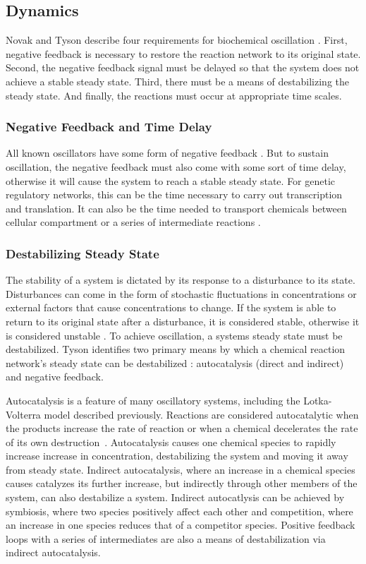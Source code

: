 \documentclass[12pt]{report}
\begin{document}
\subsection{Dynamics}
Novak and Tyson describe four requirements for biochemical oscillation \cite{Novak2008}. First, negative feedback is necessary to restore the reaction network to its original state. Second, the negative feedback signal must be delayed so that the system does not achieve a stable steady state. Third, there must be a means of destabilizing the steady state. And finally, the reactions must occur at appropriate time scales.

\subsubsection{Negative Feedback and Time Delay}
All known oscillators have some form of negative feedback \cite{novak_design_2008, Sharma2006}. But to sustain oscillation, the negative feedback must also come with some sort of time delay, otherwise it will cause the system to reach a stable steady state. For genetic regulatory networks, this can be the time necessary to carry out transcription and translation. It can also be the time needed to transport chemicals between cellular compartment or a series of intermediate reactions \cite{sharma_chemical_2006, Novak2008}.

\subsubsection{Destabilizing Steady State}
The stability of a system is dictated by its response to a disturbance to its state. Disturbances can come in the form of stochastic fluctuations in concentrations or external factors that cause concentrations to change. If the system is able to return to its original state after a disturbance, it is considered stable, otherwise it is considered unstable \cite{sauro_network_2009}. To achieve oscillation, a systems steady state must be destabilized. Tyson identifies two primary means by which a chemical reaction network's steady state can be destabilized \cite{Tyson1975}: autocatalysis (direct and indirect) and negative feedback. 

Autocatalysis is a feature of many oscillatory systems, including the Lotka-Volterra model described previously. Reactions are considered autocatalytic when the products increase the rate of reaction or when a chemical decelerates the rate of its own destruction~\cite{Tyson2004}. Autocatalysis causes one chemical species to rapidly increase increase in concentration, destabilizing the system and moving it away from steady state. Indirect autocatalysis, where an increase in a chemical species causes catalyzes its further increase, but indirectly through other members of the system, can also destabilize a system. Indirect autocatlysis can be achieved by symbiosis, where two species positively affect each other and competition, where an increase in one species reduces that of a competitor species. Positive feedback loops with a series of intermediates are also a means of destabilization via indirect autocatalysis.
\end{document}
